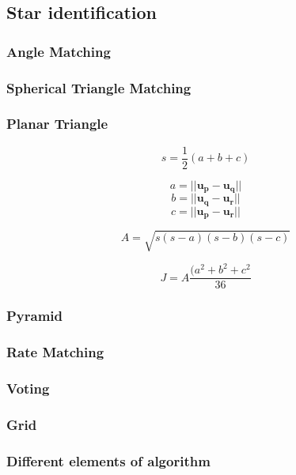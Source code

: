 \documentclass[12pt,a4paper,oneside]{article}
\begin{document}
\subsection{Star identification}
\subsubsection{Angle Matching}
\subsubsection{Spherical Triangle Matching}
\subsubsection{Planar Triangle}
\begin{equation}
s = \frac{1}{2}(a + b + c)
\end{equation}

\begin{equation}
a = ||\bm{u_p} - \bm{u_q}||
\end{equation}
\begin{equation}
b = ||\bm{u_q} - \bm{u_r}||
\end{equation}
\begin{equation}
c = ||\bm{u_p} - \bm{u_r}||
\end{equation}

\begin{equation}
A = \sqrt{s(s-a)(s-b)(s-c)}
\end{equation}

\begin{equation}
J = A\frac{(a^2 + b^2 + c^2}{36}
\end{equation}

\subsubsection{Pyramid}
\subsubsection{Rate Matching}
\subsubsection{Voting}
\subsubsection{Grid}
\subsubsection{Different elements of algorithm}
\end{document}
